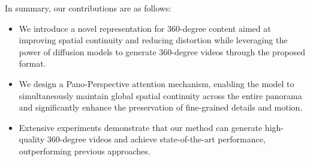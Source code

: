 In summary, our contributions are as follows: 
%
\begin{itemize}[leftmargin=*]
\item We introduce a novel representation for 360-degree content aimed at improving spatial continuity and reducing distortion while leveraging the power of diffusion models to generate 360-degree videos through the proposed format.
%
\item We design a Pano-Perspective attention mechanism, enabling the model to simultaneously maintain global spatial continuity across the entire panorama and significantly enhance the preservation of fine-grained details and motion.
%
\item Extensive experiments demonstrate that our method can generate high-quality 360-degree videos and achieve state-of-the-art performance, outperforming previous approaches.
\end{itemize}